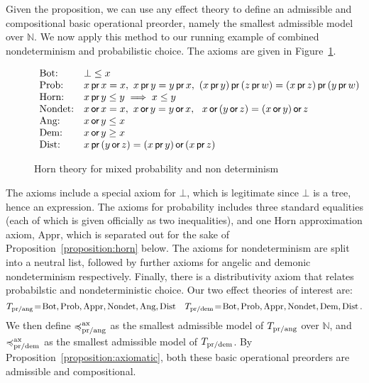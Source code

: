 Given the proposition, we can use any effect theory to define an admissible and compositional basic operational preorder, namely the smallest admissible model over $\mathbb{N}$. We now apply this method to our running example of combined nondeterminism and probabilistic choice. The  axioms are given in
Figure~\ref{fig:axiomsmixed}.
\begin{figure}[h!]
\[
\begin{array}{ll}
\text{Bot:} & \bot \leq x
\\
\text{Prob:} & x \operatorname{\textsf{pr}} x = x , ~ x \operatorname{\textsf{pr}} y = y \operatorname{\textsf{pr}} x , ~ 
                                (x \operatorname{\textsf{pr}} y) \operatorname{\textsf{pr}}\, (z \operatorname{\textsf{pr}} w) = (x \operatorname{\textsf{pr}} z) \operatorname{\textsf{pr}}\, (y \operatorname{\textsf{pr}} w)
\\
\text{Horn:} & x \operatorname{\textsf{pr}} y \leq y \implies  x \leq y
 \\
\text{Nondet:} & x \operatorname{\textsf{or}} x = x, ~ x \operatorname{\textsf{or}} y = y \operatorname{\textsf{or}} x, ~ ~ x \operatorname{\textsf{or}}\, (y \operatorname{\textsf{or}} z) = (x \operatorname{\textsf{or}} y) \operatorname{\textsf{or}} z
\\
\text{Ang:} & x \operatorname{\textsf{or}} y \leq x \\ 
\text{Dem:} & x \operatorname{\textsf{or}} y \geq x \\ 
\text{Dist:} & x \operatorname{\textsf{pr}}\, (y \operatorname{\textsf{or}} z) = (x \operatorname{\textsf{pr}} y) \operatorname{\textsf{or}}\, (x \operatorname{\textsf{pr}} z)
\end{array}
\]
    \caption{Horn theory for mixed probability and non determinism}
    \label{fig:axiomsmixed}
\end{figure}

The axioms include a special axiom for $\bot$, which is legitimate since $\bot$ is a tree, hence an expression.
The axioms  for probability includes three standard equalities (each of which is given officially as two inequalities), and one Horn approximation axiom, $\text{Appr}$, which  is separated out for the sake of Proposition~\ref{proposition:horn} below.
The axioms for nondeterminism are split into a neutral list,  followed by further axioms  for angelic and demonic nondeterminism respectively. Finally, there is a distributivity axiom that relates
probabilstic and nondeterministic choice. 
Our two effect theories of interest are: 
\[
T_{\text{pr/ang}} \!=\!  \text{Bot},  \text{Prob},  \text{Appr}, \text{Nondet}, \text{Ang},\text{Dist} \quad
T_{\text{pr/dem}}\! = \!\text{Bot},  \text{Prob},  \text{Appr},  \text{Nondet},  \text{Dem},\text{Dist}\,.
\]
We then define  $\preccurlyeq^{\text{ax}}_{\text{pr/ang}}$ as the smallest admissible model
of $T_{\text{pr/ang}}$ over $\mathbb{N}$, and 
$\preccurlyeq^{\text{ax}}_{\text{pr/dem}}$ as the smallest admissible model
of $T_{\text{pr/dem}}$. By Proposition~\ref{proposition:axiomatic}, both these basic operational preorders are admissible and compositional.

